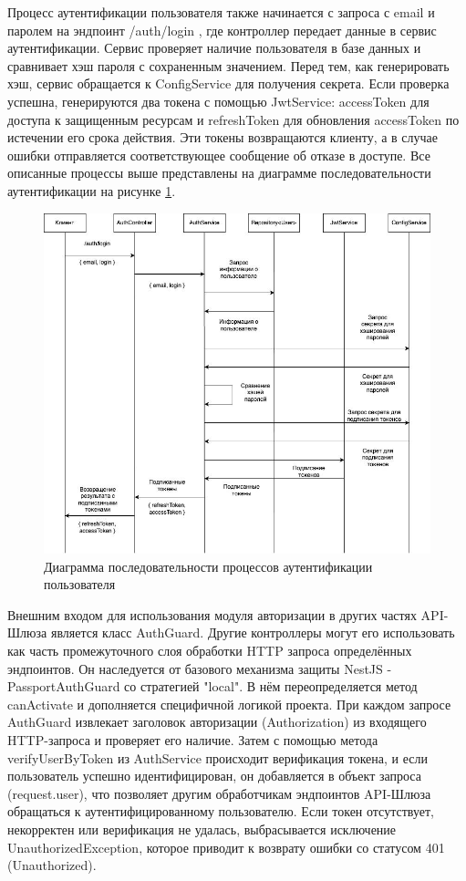 	Процесс аутентификации пользователя также начинается с запроса с email и паролем на эндпоинт /auth/login , где контроллер передает данные в сервис аутентификации. Сервис проверяет наличие пользователя в базе данных и сравнивает хэш пароля с сохраненным значением. Перед тем, как генерировать хэш, сервис обращается к ConfigService для получения секрета. Если проверка успешна, генерируются два токена с помощью JwtService: accessToken для доступа к защищенным ресурсам и refreshToken для обновления accessToken по истечении его срока действия. Эти токены возвращаются клиенту, а в случае ошибки отправляется соответствующее сообщение об отказе в доступе. Все описанные процессы выше представлены на диаграмме последовательности аутентификации на рисунке \ref{fig:login_processes}.

	\begin{figure}[ht!] 
		\center
		\includegraphics [scale=0.37] {my_folder/images//login_processes}
		\caption{Диаграмма последовательности процессов аутентификации пользователя} 
		\label{fig:login_processes}  
	\end{figure}

	Внешним входом для использования модуля авторизации в других частях API-Шлюза является класс AuthGuard. Другие контроллеры могут его использовать как часть промежуточного слоя обработки HTTP запроса определённых эндпоинтов. Он наследуется от базового механизма защиты NestJS - PassportAuthGuard со стратегией "local". В нём переопределяется метод canActivate и дополняется специфичной логикой проекта. При каждом запросе AuthGuard извлекает заголовок авторизации (Authorization) из входящего HTTP-запроса и проверяет его наличие. Затем с помощью метода verifyUserByToken из AuthService происходит верификация токена, и если пользователь успешно идентифицирован, он добавляется в объект запроса (request.user), что позволяет другим обработчикам эндпоинтов API-Шлюза обращаться к аутентифицированному пользователю. Если токен отсутствует, некорректен или верификация не удалась, выбрасывается исключение UnauthorizedException, которое приводит к возврату ошибки со статусом 401 (Unauthorized).

